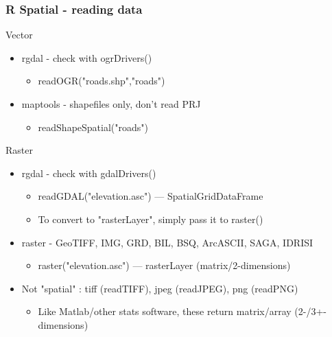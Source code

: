 \documentclass[11pt]{beamer}
\begin{document}
\begin{frame}
\frametitle{R Spatial - reading data}
Vector
\begin{itemize}
\item rgdal - check with ogrDrivers()
\begin{itemize}
\item readOGR("roads.shp","roads")
\end{itemize}
\item maptools - shapefiles only, don't read PRJ
\begin{itemize}
\item readShapeSpatial("roads")
\end{itemize}
\end{itemize}
Raster
\begin{itemize}
\item rgdal - check with gdalDrivers()
\begin{itemize}
\item readGDAL("elevation.asc") --- SpatialGridDataFrame
\item To convert to "rasterLayer", simply pass it to raster()
\end{itemize}
\item raster - GeoTIFF, IMG, GRD, BIL, BSQ, ArcASCII, SAGA, IDRISI
\begin{itemize}
\item raster("elevation.asc") --- rasterLayer (matrix/2-dimensions)
\end{itemize}
\item Not "spatial" : tiff (readTIFF), jpeg (readJPEG), png (readPNG) 
\begin{itemize}
\item Like Matlab/other stats software, these return matrix/array (2-/3+- dimensions)
\end{itemize}
\end{itemize}
\end{frame}
\end{document}
